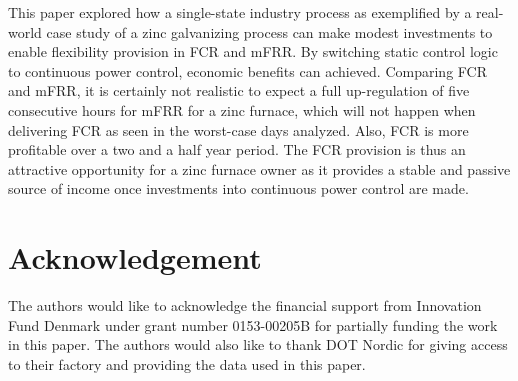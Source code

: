 \documentclass[conference]{IEEEtran}
\begin{document}
This paper explored how a single-state industry process as exemplified by a real-world case study of a zinc galvanizing process can make modest investments to enable flexibility provision in FCR and mFRR. By switching static control logic to continuous power control, economic benefits can achieved. Comparing FCR and mFRR, it is certainly not realistic to expect a full up-regulation of five consecutive hours for mFRR for a zinc furnace, which will not happen when delivering FCR as seen in the worst-case days analyzed. Also, FCR is more profitable over a two and a half year period. The FCR provision is thus an attractive opportunity for a zinc furnace owner as it provides a stable and passive source of income once investments into continuous power control are made.

\section*{Acknowledgement}

The authors would like to acknowledge the financial support from Innovation Fund Denmark under grant number 0153-00205B for partially funding the work in this paper. The authors would also like to thank DOT Nordic for giving access to their factory and providing the data used in this paper.
\end{document}
